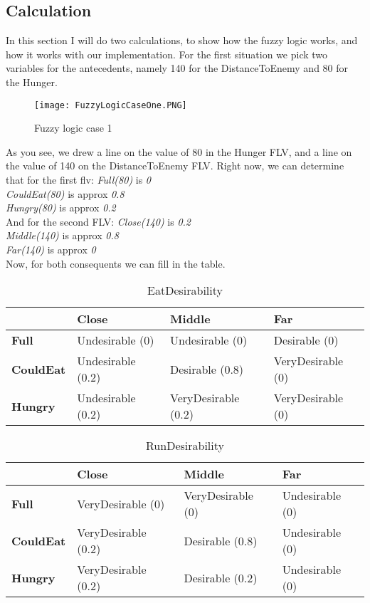 \subsection{Calculation}\label{subsec:calculation}
In this section I will do two calculations, to show how the fuzzy logic works, and how it works with our implementation.
For the first situation we pick two variables for the antecedents, namely 140 for the DistanceToEnemy and 80 for the Hunger.
\begin{figure}[ht]
    \begin{center}
        \texttt{[image: FuzzyLogicCaseOne.PNG]}
    \end{center}
    \caption{Fuzzy logic case 1}
    \label{fig:FuzzyLogicCaseOne}
\end{figure}
As you see, we drew a line on the value of 80 in the Hunger FLV, and a line on the value of 140 on the DistanceToEnemy FLV\@.
Right now, we can determine that for the first flv:
{\em Full(80)} is {\em 0} \\
{\em CouldEat(80)} is approx {\em  0.8} \\
{\em Hungry(80)} is approx {\em 0.2} \\
And for the second FLV:
{\em Close(140)} is {\em 0.2} \\
{\em Middle(140)} is approx {\em 0.8} \\
{\em Far(140)} is approx {\em 0} \\
Now, for both consequents we can fill in the table.
\begin{table}[ht]
    \centering
    \label{EatDesirabilityCaseOne}
    \begin{tabular}{|l|l|l|l|}
        \hline
        & \textbf{Close}    & \textbf{Middle}     & \textbf{Far}           \\ \hline
        \textbf{Full}     & Undesirable (0)   & Undesirable   (0)   & Desirable     (0) \\ \hline
        \textbf{CouldEat} & Undesirable (0.2) & Desirable     (0.8) & VeryDesirable (0) \\ \hline
        \textbf{Hungry}   & Undesirable (0.2) & VeryDesirable (0.2) & VeryDesirable (0) \\ \hline
    \end{tabular}
    \caption{EatDesirability}
\end{table}
\begin{table}[ht]
    \centering
    \label{RunDesirabilityCaseOne}
    \begin{tabular}{|l|l|l|l|}
        \hline
                          & \textbf{Close}      & \textbf{Middle}     & \textbf{Far}\\ \hline
        \textbf{Full}     & VeryDesirable (0)   & VeryDesirable (0)   & Undesirable (0) \\ \hline
        \textbf{CouldEat} & VeryDesirable (0.2) & Desirable     (0.8) & Undesirable (0) \\ \hline
        \textbf{Hungry}   & VeryDesirable (0.2) & Desirable     (0.2) & Undesirable (0) \\ \hline
    \end{tabular}
    \caption{RunDesirability}
\end{table}
